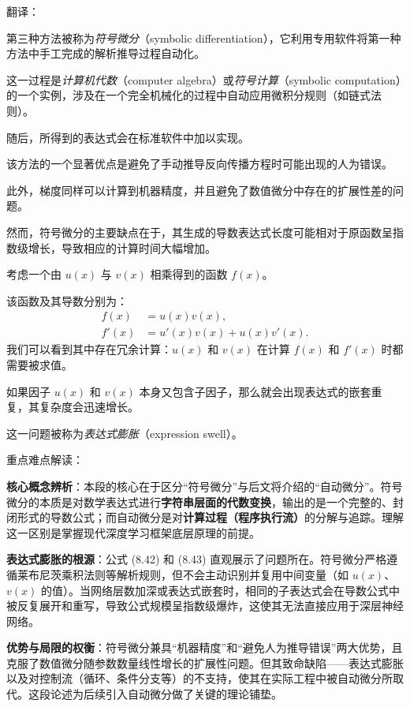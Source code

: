 \documentclass{article}
\begin{document}
{\color{red}
翻译：

第三种方法被称为\textit{符号微分}（symbolic differentiation），它利用专用软件将第一种方法中手工完成的解析推导过程自动化。

这一过程是\textit{计算机代数}（computer algebra）或\textit{符号计算}（symbolic computation）的一个实例，涉及在一个完全机械化的过程中自动应用微积分规则（如链式法则）。

随后，所得到的表达式会在标准软件中加以实现。

该方法的一个显著优点是避免了手动推导反向传播方程时可能出现的人为错误。

此外，梯度同样可以计算到机器精度，并且避免了数值微分中存在的扩展性差的问题。

然而，符号微分的主要缺点在于，其生成的导数表达式长度可能相对于原函数呈指数级增长，导致相应的计算时间大幅增加。

考虑一个由 $u(x)$ 与 $v(x)$ 相乘得到的函数 $f(x)$。

该函数及其导数分别为：
\begin{align}
    f(x) &= u(x)v(x), \tag{8.42} \\
    f'(x) &= u'(x)v(x) + u(x)v'(x). \tag{8.43}
\end{align}
我们可以看到其中存在冗余计算：$u(x)$ 和 $v(x)$ 在计算 $f(x)$ 和 $f'(x)$ 时都需要被求值。

如果因子 $u(x)$ 和 $v(x)$ 本身又包含子因子，那么就会出现表达式的嵌套重复，其复杂度会迅速增长。

这一问题被称为\textit{表达式膨胀}（expression swell）。
}

{\color{blue}
重点难点解读：

\textbf{核心概念辨析}：本段的核心在于区分“符号微分”与后文将介绍的“自动微分”。符号微分的本质是对数学表达式进行\textbf{字符串层面的代数变换}，输出的是一个完整的、封闭形式的导数公式；而自动微分是对\textbf{计算过程（程序执行流）}的分解与追踪。理解这一区别是掌握现代深度学习框架底层原理的前提。
    
\textbf{表达式膨胀的根源}：公式 (8.42) 和 (8.43) 直观展示了问题所在。符号微分严格遵循莱布尼茨乘积法则等解析规则，但不会主动识别并复用中间变量（如 $u(x)$、$v(x)$ 的值）。当网络层数加深或表达式嵌套时，相同的子表达式会在导数公式中被反复展开和重写，导致公式规模呈指数级爆炸，这使其无法直接应用于深层神经网络。
    
\textbf{优势与局限的权衡}：符号微分兼具“机器精度”和“避免人为推导错误”两大优势，且克服了数值微分随参数数量线性增长的扩展性问题。但其致命缺陷——表达式膨胀以及对控制流（循环、条件分支等）的不支持，使其在实际工程中被自动微分所取代。这段论述为后续引入自动微分做了关键的理论铺垫。
}
\end{document}
